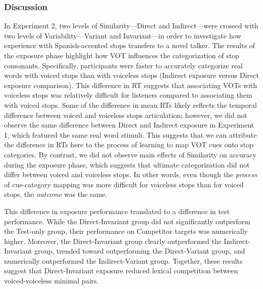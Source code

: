 \documentclass[
  12pt,
  twoside]{article}
\begin{document}
\hypertarget{discuss-1b}{%
\subsubsection{Discussion}\label{discuss-1b}}

In Experiment 2, two levels of Similarity---Direct and Indirect---were crossed with two levels of Variability---Variant and Invariant---in order to investigate how experience with Spanish-accented stops transfers to a novel talker.
The results of the exposure phase highlight how VOT influences the categorization of stop consonants.
Specifically, participants were faster to accurately categorize real words with voiced stops than with voiceless stops (Indirect exposure versus Direct exposure comparison).
This difference in RT suggests that associating VOTs with voiceless stops was relatively difficult for listeners compared to associating them with voiced stops.
Some of the difference in mean RTs likely reflects the temporal difference between voiced and voiceless stops articulation; however, we did not observe the same difference between Direct and Indirect exposure in Experiment 1, which featured the same real word stimuli.
This suggests that we can attribute the difference in RTs here to the process of learning to map VOT cues onto stop categories.
By contrast, we did not observe main effects of Similarity on accuracy during the exposure phase, which suggests that ultimate categorization did not differ between voiced and voiceless stops.
In other words, even though the \emph{process} of cue-category mapping was more difficult for voiceless stops than for voiced stops, the \emph{outcome} was the same.

This difference in exposure performance translated to a difference in test performance.
While the Direct-Invariant group did not significantly outperform the Test-only group, their performance on Competitor targets was numerically higher.
Moreover, the Direct-Invariant group clearly outperformed the Indirect-Invariant group, trended toward outperforming the Direct-Variant group, and numerically outperformed the Indirect-Variant group.
Together, these results suggest that Direct-Invariant exposure reduced lexical competition between voiced-voiceless minimal pairs.
\end{document}
